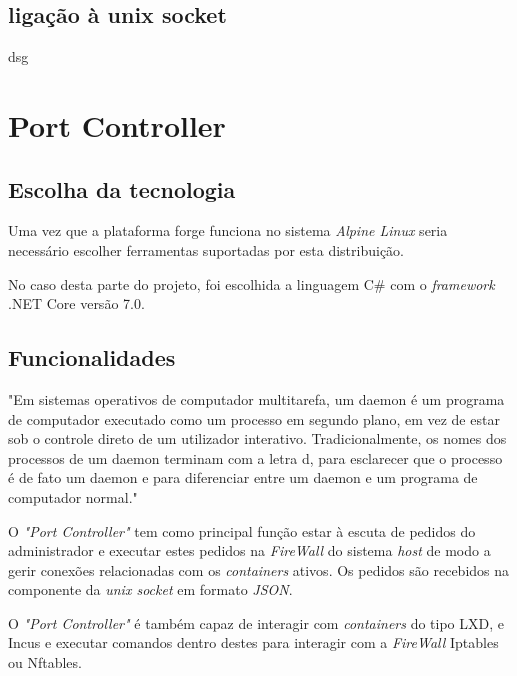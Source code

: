 \subsection{ligação à unix socket}

dsg













\section{Port Controller}

\subsection{Escolha da tecnologia}

Uma vez que a plataforma forge funciona no sistema \textit{Alpine Linux} seria
necessário escolher ferramentas suportadas por esta distribuição.

No caso desta parte do projeto, foi escolhida a linguagem C\# com o 
\textit{framework} .NET Core versão 7.0.



\subsection{Funcionalidades}

"Em sistemas operativos de computador multitarefa, um daemon é um programa de 
computador executado como um processo em segundo plano, em vez de estar sob o 
controle direto de um utilizador interativo. Tradicionalmente, os nomes dos processos
de um daemon terminam com a letra d, para esclarecer que o processo é de fato um 
daemon e para diferenciar entre um daemon e um programa de computador normal." \cite{daemon}


O \textit{"Port Controller"} tem como principal função estar à escuta de pedidos
do administrador e executar estes pedidos na \textit{FireWall} do sistema
\textit{host} de modo a gerir conexões relacionadas com os \textit{containers}
ativos. Os pedidos são recebidos na componente da \textit{unix socket} em formato
\textit{JSON}.


O \textit{"Port Controller"} é também capaz de interagir com \textit{containers}
do tipo LXD, e Incus e executar comandos dentro destes para interagir com a
\textit{FireWall} Iptables ou Nftables.

